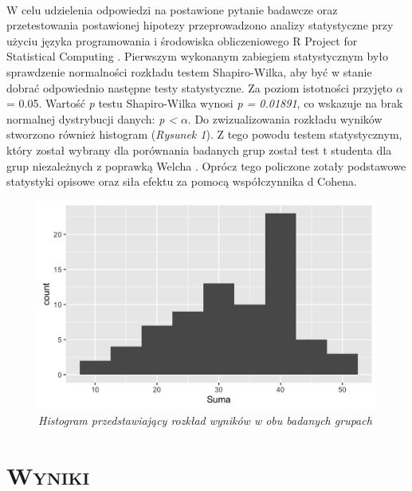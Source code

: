 \documentclass[12pt,a4paper,final,oneside,onecolumn,titlepage]{article}
\begin{document}
\paragraph{}
W celu udzielenia odpowiedzi na postawione pytanie badawcze oraz przetestowania postawionej hipotezy przeprowadzono analizy statystyczne przy użyciu języka programowania i środowiska obliczeniowego R Project for Statistical Computing \citep{Rstudio}. Pierwszym wykonanym zabiegiem statystycznym było sprawdzenie normalności rozkładu testem Shapiro-Wilka, aby być w stanie dobrać odpowiednio następne testy statystyczne. Za poziom istotności przyjęto $\alpha$ = 0.05. Wartość \textit{p} testu Shapiro-Wilka wynosi \textit{p = 0.01891}, co wskazuje na brak normalnej dystrybucji danych: \textit{p <} $\alpha$. Do zwizualizowania rozkładu wyników stworzono również histogram (\textit{Rysunek 1}). Z tego powodu testem statystycznym, który został wybrany dla porównania badanych grup został test t studenta dla grup niezależnych z poprawką Welcha \citep{welch_generalization_1947}. Oprócz tego policzone zotały podstawowe statystyki opisowe oraz siła efektu za pomocą współczynnika d Cohena.
\begin{figure}[h!]
\caption{\textit{Histogram przedstawiający rozkład wyników w obu badanych grupach}}
\centering
\includegraphics[scale=0.25]{histogram_all}
\end{figure}
\pagebreak
\section*{\large{\textbf{\textsc{Wyniki}}}}
\end{document}
